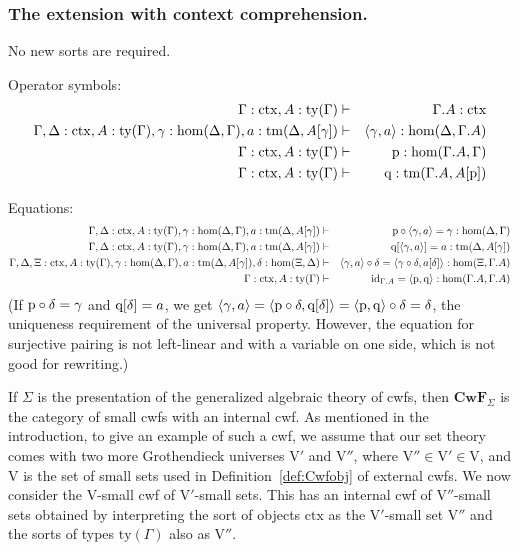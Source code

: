 \documentclass{mscs}
\def\V{\mathrm{V}}
\def\Cwf{\mathbf{CwF}}
\def\Hom{\mathrm{hom}}
\def\id{\mathrm{id}}
\newcommand{\ctx}{\mathrm{ctx}}
\newcommand{\ty}{\mathrm{ty}}
\newcommand{\tm}{\mathrm{tm}}
\begin{document}
\subsubsection{The extension with context comprehension.}

No new sorts are required.

Operator symbols:
\begin{eqnarray*}
\Gamma : \ctx, A:\ty(\Gamma) &\vdash& \Gamma\cext A : \ctx\\
\Gamma,\Delta : \ctx, A:\ty(\Gamma), \gamma : \Hom(\Delta,\Gamma), a:\tm(\Delta,A[\gamma]) &\vdash& \tuple{\gamma,a} : \Hom(\Delta,\Gamma\cext A)\\
\Gamma : \ctx, A:\ty(\Gamma) &\vdash& \p: \Hom(\Gamma\cext A,\Gamma)\\
\Gamma : \ctx, A:\ty(\Gamma) &\vdash& \q: \tm(\Gamma\cext A,A[\p])
\end{eqnarray*}

Equations:
\begin{eqnarray*}
\Gamma,\Delta : \ctx, A:\ty(\Gamma), \gamma : \Hom(\Delta,\Gamma), a:\tm(\Delta,A[\gamma]) &\vdash& \p\circ\tuple{\gamma,a} = \gamma : \Hom(\Delta,\Gamma)\\
\Gamma,\Delta : \ctx, A:\ty(\Gamma), \gamma : \Hom(\Delta,\Gamma), a:\tm(\Delta,A[\gamma]) &\vdash& \q[\tuple{\gamma,a}] = a : \tm(\Delta,A[\gamma]) \\
\Gamma,\Delta,\Xi : \ctx, A:\ty(\Gamma), \gamma : \Hom(\Delta,\Gamma), a:\tm(\Delta,A[\gamma]), \delta : \Hom(\Xi,\Delta) &\vdash&
\tuple{\gamma,a} \circ \delta = \tuple{\gamma\circ\delta,a[\delta]} :
\Hom(\Xi,\Gamma\cext A) \\
\Gamma : \ctx, A:\ty(\Gamma) &\vdash&
\id_{\Gamma\cext A} = \tuple{\p,\q} : \Hom(\Gamma\cext A,\Gamma\cext A)
\end{eqnarray*}
(If $\mathrm{p}\circ\delta = \gamma$ and $\mathrm{q}[\delta]=a$, we get
$\langle \gamma,a \rangle=\langle \mathrm{p}\circ\delta, \mathrm{q}[\delta] \rangle = \langle \mathrm{p},\mathrm{q} \rangle\circ\delta =
\delta$, the uniqueness requirement of the universal property.
However, the equation for surjective pairing is not left-linear and with
a variable on one side, which is not good for rewriting.)

If $\Sigma$ is the presentation of the generalized algebraic theory of cwfs, then $\Cwf_\Sigma$ is the category of small cwfs with an internal cwf. As mentioned in the introduction, to give an example of such a cwf, we assume that our set theory comes with two more Grothendieck universes $\V'$ and $\V''$, where $\V''  \in \V' \in \V$, and $\V$ is the set of small sets used in Definition~\ref{def:Cwfobj} of external cwfs. We now consider the $\V$-small cwf of $\V'$-small sets. This has an internal cwf of $\V''$-small sets obtained by interpreting the sort of objects $\ctx$ as the $\V'$-small set $\V''$ and the sorts of types $\ty(\Gamma)$ also as $\V''$.
\end{document}
